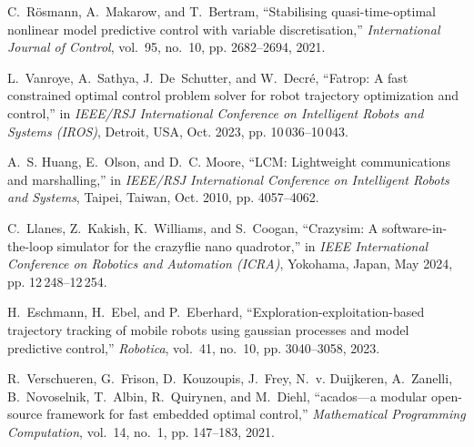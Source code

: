 \documentclass[conference,preprint]{IEEEtran}
\begin{document}
\begin{thebibliography}{99}
  C.~Rösmann, A.~Makarow, and T.~Bertram, ``Stabilising quasi-time-optimal
    nonlinear model predictive control with variable discretisation,''
    \emph{International Journal of Control}, vol.~95, no.~10, pp. 2682--2694, 2021.
  
  L.~Vanroye, A.~Sathya, J.~De~Schutter, and W.~Decré, ``Fatrop: A fast
    constrained optimal control problem solver for robot trajectory optimization
    and control,'' in \emph{IEEE/RSJ International Conference on Intelligent
    Robots and Systems (IROS)}, Detroit, USA, Oct. 2023, pp. 10\,036--10\,043.
  
  A.~S. Huang, E.~Olson, and D.~C. Moore, ``LCM: Lightweight communications and
    marshalling,'' in \emph{IEEE/RSJ International Conference on Intelligent
    Robots and Systems}, Taipei, Taiwan, Oct. 2010, pp. 4057--4062.
  
  C.~Llanes, Z.~Kakish, K.~Williams, and S.~Coogan, ``Crazysim: A
    software-in-the-loop simulator for the crazyflie nano quadrotor,'' in
    \emph{IEEE International Conference on Robotics and Automation (ICRA)},
    Yokohama, Japan, May 2024, pp. 12\,248--12\,254.
  
  H.~Eschmann, H.~Ebel, and P.~Eberhard, ``Exploration-exploitation-based
    trajectory tracking of mobile robots using gaussian processes and model
    predictive control,'' \emph{Robotica}, vol.~41, no.~10, pp. 3040--3058, 2023.
  
  R.~Verschueren, G.~Frison, D.~Kouzoupis, J.~Frey, N.~v. Duijkeren, A.~Zanelli,
    B.~Novoselnik, T.~Albin, R.~Quirynen, and M.~Diehl, ``acados—a modular
    open-source framework for fast embedded optimal control,'' \emph{Mathematical
    Programming Computation}, vol.~14, no.~1, pp. 147--183, 2021.


\end{thebibliography}
\end{document}
